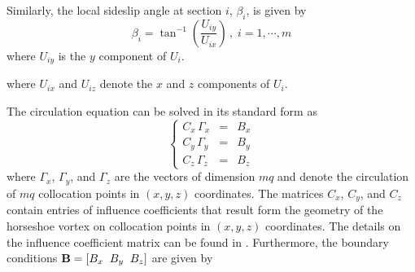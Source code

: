 \documentclass[11pt]{ucthesis}
\begin{document}
Similarly, the local sideslip angle at section $i$, $\beta_i$, is given by 
\begin{equation}
\beta_{i} = \tan^{-1} \left (\frac{U_{iy}}{U_{ix}} \right) \,,\;i=1,\cdots, m
\label{eqn:beta_aero}
\end{equation}
where $U_{iy}$ is the $y$ component of $U_i$.

where $U_{ix}$ and $U_{iz}$ denote the $x$ and $z$ components of $U_{i}$. 

The circulation equation can be solved in its standard form as \cite{melin2000vortex}
\begin{equation}    \label{eqn:RHSGamma}
\left \{
\begin{array}{rll}
C_x \, \Gamma_x & = & B_x \\
C_y \, \Gamma_y & = & B_y \\
C_z \, \Gamma_z & = & B_z
\end{array}
\right .
\end{equation}
where $\Gamma_x$, $\Gamma_y$, and $\Gamma_z$ are the vectors of dimension $mq$ and denote the circulation of $mq$ collocation points in $(x,y,z)$ coordinates. The matrices $C_x$, $C_y$, and $C_z$ contain entries of influence coefficients that result form the geometry of the horseshoe vortex on collocation points in $(x,y,z)$ coordinates. The details on the influence coefficient matrix can be found in \cite{melin2000vortex}. Furthermore, the boundary conditions ${\bf B} = [B_x \;\; B_y \;\;B_z]$ are given by
\end{document}
